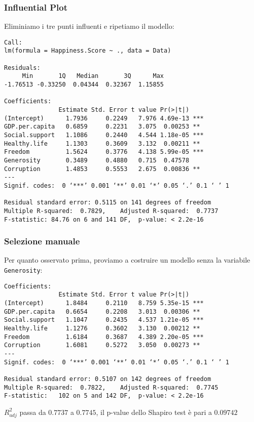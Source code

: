 \documentclass{beamer}
\newcommand{\fg}[2]{%
  \begin{center}
      \texttt{[image: \#2]}%
  \end{center}
}
\begin{document}
\begin{frame}
    \frametitle{Influential Plot}
\end{frame}

\begin{frame}[fragile]
    Eliminiamo i tre punti influenti e ripetiamo il modello:

    \tiny
    \begin{verbatim}
Call:
lm(formula = Happiness.Score ~ ., data = Data)

Residuals:
     Min       1Q   Median       3Q      Max 
-1.76513 -0.33250  0.04344  0.32367  1.15855 

Coefficients:
               Estimate Std. Error t value Pr(>|t|)    
(Intercept)      1.7936     0.2249   7.976 4.69e-13 ***
GDP.per.capita   0.6859     0.2231   3.075  0.00253 ** 
Social.support   1.1086     0.2440   4.544 1.18e-05 ***
Healthy.life     1.1303     0.3609   3.132  0.00211 ** 
Freedom          1.5624     0.3776   4.138 5.99e-05 ***
Generosity       0.3489     0.4880   0.715  0.47578    
Corruption       1.4853     0.5553   2.675  0.00836 ** 
---
Signif. codes:  0 ‘***’ 0.001 ‘**’ 0.01 ‘*’ 0.05 ‘.’ 0.1 ‘ ’ 1

Residual standard error: 0.5115 on 141 degrees of freedom
Multiple R-squared:  0.7829,    Adjusted R-squared:  0.7737 
F-statistic: 84.76 on 6 and 141 DF,  p-value: < 2.2e-16
    \end{verbatim}
\end{frame}

\begin{frame}[fragile]
    \frametitle{Selezione manuale}
    Per quanto osservato prima, proviamo a costruire un modello senza la variabile \texttt{Generosity}:

    \tiny
    \begin{verbatim}
Coefficients:
               Estimate Std. Error t value Pr(>|t|)    
(Intercept)      1.8484     0.2110   8.759 5.35e-15 ***
GDP.per.capita   0.6654     0.2208   3.013  0.00306 ** 
Social.support   1.1047     0.2435   4.537 1.21e-05 ***
Healthy.life     1.1276     0.3602   3.130  0.00212 ** 
Freedom          1.6184     0.3687   4.389 2.20e-05 ***
Corruption       1.6081     0.5272   3.050  0.00273 ** 
---
Signif. codes:  0 ‘***’ 0.001 ‘**’ 0.01 ‘*’ 0.05 ‘.’ 0.1 ‘ ’ 1

Residual standard error: 0.5107 on 142 degrees of freedom
Multiple R-squared:  0.7822,    Adjusted R-squared:  0.7745 
F-statistic:   102 on 5 and 142 DF,  p-value: < 2.2e-16
    \end{verbatim}

    \normalsize 
    $R^2_{adj}$ passa da $0.7737$ a $0.7745$, il p-value dello Shapiro test è pari a $0.09742$ 
\end{frame}
\end{document}
